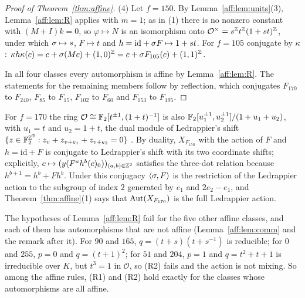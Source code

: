\begin{proof}[Proof of Theorem~\ref{thm:affine}]
(4) Let $f=150$. By Lemma~\ref{aff:lem:units}(3), Lemma~\ref{aff:lem:R} applies with $m=1$; as in (1) there is no nonzero constant with $(M+I)k=0$, so $\varphi\mapsto N$ is an isomorphism onto $\mathcal O^{\times}=s^{\mathbb{Z}}t^{\mathbb{Z}}(1+st)^{\mathbb{Z}}$, under which $\sigma\mapsto s$, $F\mapsto t$ and $h=\mathrm{id}+\sigma F\mapsto1+st$. For $f=105$ conjugate by $\kappa$: $\kappa h\kappa(c)=c+\sigma(Mc)+(1,0)^{\mathbb{Z}}=c+\sigma F_{105}(c)+(1,1)^{\mathbb{Z}}$.

In all four classes every automorphism is affine by Lemma~\ref{aff:lem:R}. The statements for the remaining members follow by reflection, which conjugates $F_{170}$ to $F_{240}$, $F_{85}$ to $F_{15}$, $F_{102}$ to $F_{60}$ and $F_{153}$ to $F_{195}$.
\end{proof}

\begin{remark}\label{aff:rem:ledrappier}
For $f=170$ the ring $\mathcal O\cong\mathbb{F}_2[t^{\pm1},(1+t)^{-1}]$ is also $\mathbb{F}_2[u_1^{\pm1},u_2^{\pm1}]/(1+u_1+u_2)$, with $u_1=t$ and $u_2=1+t$, the dual module of Ledrappier's shift $\{z\in\mathbb{F}_2^{\mathbb{Z}^2}:z_v+z_{v+e_1}+z_{v+e_2}=0\}$ \cite{Ledrappier1978}. By duality, $X_{F_{170}}$ with the action of $F$ and $h=\mathrm{id}+F$ is conjugate to Ledrappier's shift with its two coordinate shifts; explicitly, $c\mapsto(y(F^ah^b(c)_0))_{(a,b)\in\mathbb{Z}^2}$ satisfies the three-dot relation because $h^{b+1}=h^b+Fh^b$. Under this conjugacy $\langle\sigma,F\rangle$ is the restriction of the Ledrappier action to the subgroup of index $2$ generated by $e_1$ and $2e_2-e_1$, and Theorem~\ref{thm:affine}(1) says that $\operatorname{Aut}(X_{F_{170}})$ is the full Ledrappier action.
\end{remark}

\begin{remark}\label{aff:rem:consist}
The hypotheses of Lemma~\ref{aff:lem:R} fail for the five other affine classes, and each of them has automorphisms that are not affine (Lemma~\ref{aff:lem:comm} and the remark after it). For $90$ and $165$, $q=(t+s)(t+s^{-1})$ is reducible; for $0$ and $255$, $p=0$ and $q=(t+1)^2$; for $51$ and $204$, $p=1$ and $q=t^2+t+1$ is irreducible over $K$, but $t^3=1$ in $\mathcal O$, so (R2) fails and the action is not mixing. So among the affine rules, (R1) and (R2) hold exactly for the classes whose automorphisms are all affine.
\end{remark}


